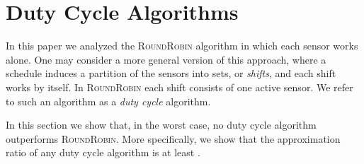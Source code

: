 \documentclass[11pt]{article}
\newcommand{\rr}{\textsc{RoundRobin}\xspace}
\begin{document}
\fi 



\section{Duty Cycle Algorithms}
\label{sec:dc}

In this paper we analyzed the \rr algorithm in which each
sensor works alone.  One may consider a more general version of this
approach, where a schedule induces a partition of the sensors into
sets, or \emph{shifts}, and each shift works by itself.  In \rr each
shift consists of one active sensor.  We refer to such an algorithm as a
\emph{duty cycle} algorithm.

In this section we show that, in the worst case, no duty cycle
algorithm outperforms \rr.  More specifically, we show that the
approximation ratio of any duty cycle algorithm is at least
.
\end{document}

